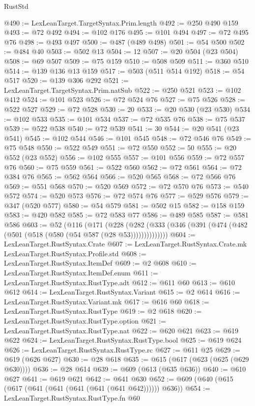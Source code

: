 \begin{lexlean}{RustStd}
\begin{coremodule}
@490 := LexLeanTarget.TargetSyntax.Prim.length
@492 := @250 @490 @159
@493 := @72 @492
@494 := @102 @176
@495 := @101 @494
@497 := @72 @495 @76
@498 := @493 @497
@500 := @487 (@489 @498)
@501 := @54 @500
@502 := @484 @40
@503 := @502 @13
@504 := 12
@507 := @20 @504 (@23 @504)
@508 := @69 @507
@509 := @75 @159
@510 := @508 @509
@511 := @360 @510
@514 := @139 @136 @13 @159
@517 := @503 (@511 @514 @192)
@518 := @54 @517
@520 := @139 @306 @292
@521 := LexLeanTarget.TargetSyntax.Prim.natSub
@522 := @250 @521
@523 := @102 @412
@524 := @101 @523
@526 := @72 @524 @76
@527 := @75 @526
@528 := @522 @527
@529 := @72 @528
@530 := 20
@533 := @20 @530 (@23 @530)
@534 := @102 @533
@535 := @101 @534
@537 := @72 @535 @76
@538 := @75 @537
@539 := @522 @538
@540 := @72 @539
@541 := 30
@544 := @20 @541 (@23 @541)
@545 := @102 @544
@546 := @101 @545
@548 := @72 @546 @76
@549 := @75 @548
@550 := @522 @549
@551 := @72 @550
@552 := 50
@555 := @20 @552 (@23 @552)
@556 := @102 @555
@557 := @101 @556
@559 := @72 @557 @76
@560 := @75 @559
@561 := @522 @560
@562 := @72 @561
@564 := @72 @384 @76
@565 := @562 @564
@566 := @520 @565
@568 := @72 @566 @76
@569 := @551 @568
@570 := @520 @569
@572 := @72 @570 @76
@573 := @540 @572
@574 := @520 @573
@576 := @72 @574 @76
@577 := @529 @576
@579 := @347 (@520 @577)
@580 := @54 @579
@581 := @502 @15
@582 := @158 @159
@583 := @420 @582
@585 := @72 @583 @77
@586 := @489 @585
@587 := @581 @586
@603 := @52
    (@116
      (@171
        (@228 (@282 (@333 (@346 (@391 (@474 (@482 (@501 (@518 (@580 (@54 @587 (@28 @53))))))))))))))
@604 := LexLeanTarget.RustSyntax.Crate
@607 := LexLeanTarget.RustSyntax.Crate.mk LexLeanTarget.RustSyntax.Profile.std
@608 := LexLeanTarget.RustSyntax.ItemDef
@609 := @2 @608
@610 := LexLeanTarget.RustSyntax.ItemDef.enum
@611 := LexLeanTarget.RustSyntax.RustType.adt
@612 := @611 @60
@613 := @610 @612
@614 := LexLeanTarget.RustSyntax.Variant
@615 := @2 @614
@616 := LexLeanTarget.RustSyntax.Variant.mk
@617 := @616 @60
@618 := LexLeanTarget.RustSyntax.RustType
@619 := @2 @618
@620 := LexLeanTarget.RustSyntax.RustType.option
@621 := LexLeanTarget.RustSyntax.RustType.nat
@622 := @620 @621
@623 := @619 @622
@624 := LexLeanTarget.RustSyntax.RustType.bool
@625 := @619 @624
@626 := LexLeanTarget.RustSyntax.RustType.rc
@627 := @611 @25
@629 := @619 (@626 @627)
@630 := @28 @618
@635 := @615 (@617 (@623 (@625 (@629 @630))))
@636 := @28 @614
@639 := @609 (@613 (@635 @636))
@640 := @610 @627
@641 := @619 @621
@642 := @641 @630
@652 := @609 (@640 (@615 (@617 (@641 (@641 (@641 (@641 (@641 @642)))))) @636))
@654 := LexLeanTarget.RustSyntax.RustType.fn @60

\end{coremodule}
\end{lexlean}
